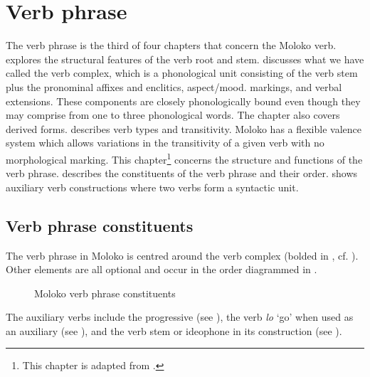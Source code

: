 \chapter[Verb phrase]{Verb phrase}\label{chap:8}
\hypertarget{RefHeading1212501525720847}{}
The verb phrase is the third of four chapters that concern the Moloko verb.  explores the structural features of the verb root and stem.  discusses what we have called the verb complex, which is a phonological unit consisting of the verb stem plus the pronominal affixes and enclitics, aspect/mood. markings, and verbal extensions. These components are closely phonologically bound even though they may comprise from one to three phonological words. The chapter also covers derived forms.  describes verb types and transitivity. Moloko has a flexible valence system which allows variations in the transitivity of a given verb with no morphological marking. This chapter\footnote{This chapter is adapted from \citealt{FriesenMamalis2008}.} concerns the structure and functions of the verb phrase.  describes the constituents of the verb phrase and their order.  shows auxiliary verb constructions where two verbs form a syntactic unit. 

\section{Verb phrase constituents}\label{sec:8.1}
\hypertarget{RefHeading1212521525720847}{}
The verb phrase in Moloko is centred around the verb complex (bolded in , cf. ).  Other elements are all optional and occur in the order diagrammed in . 

\begin{figure}
\caption{Moloko verb phrase constituents\label{fig:15}}\end{figure}

The auxiliary verbs include the progressive (see ), the verb \textit{l}\textit{o} ‘go’ when used as an auxiliary (see ), and the verb stem or ideophone in its construction (see ). 

